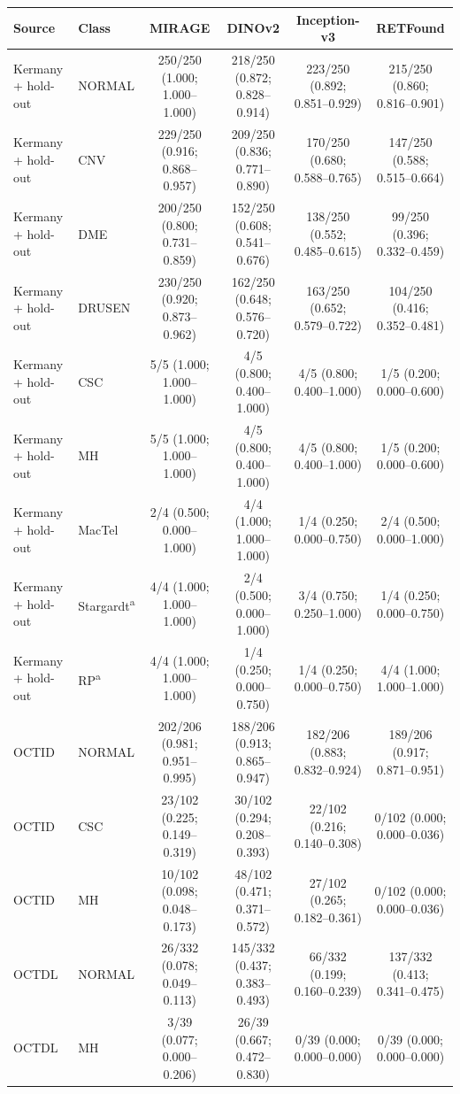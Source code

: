 \begin{tabular}{@{}llcccc@{}}
\toprule
Source & Class & MIRAGE & DINOv2 & Inception-v3 & RETFound \\
\midrule
Kermany + hold-out & NORMAL & 250/250 (1.000; 1.000--1.000) & 218/250 (0.872; 0.828--0.914) & 223/250 (0.892; 0.851--0.929) & 215/250 (0.860; 0.816--0.901) \\
Kermany + hold-out & CNV & 229/250 (0.916; 0.868--0.957) & 209/250 (0.836; 0.771--0.890) & 170/250 (0.680; 0.588--0.765) & 147/250 (0.588; 0.515--0.664) \\
Kermany + hold-out & DME & 200/250 (0.800; 0.731--0.859) & 152/250 (0.608; 0.541--0.676) & 138/250 (0.552; 0.485--0.615) & 99/250 (0.396; 0.332--0.459) \\
Kermany + hold-out & DRUSEN & 230/250 (0.920; 0.873--0.962) & 162/250 (0.648; 0.576--0.720) & 163/250 (0.652; 0.579--0.722) & 104/250 (0.416; 0.352--0.481) \\
Kermany + hold-out & CSC & 5/5 (1.000; 1.000--1.000) & 4/5 (0.800; 0.400--1.000) & 4/5 (0.800; 0.400--1.000) & 1/5 (0.200; 0.000--0.600) \\
Kermany + hold-out & MH & 5/5 (1.000; 1.000--1.000) & 4/5 (0.800; 0.400--1.000) & 4/5 (0.800; 0.400--1.000) & 1/5 (0.200; 0.000--0.600) \\
Kermany + hold-out & MacTel & 2/4 (0.500; 0.000--1.000) & 4/4 (1.000; 1.000--1.000) & 1/4 (0.250; 0.000--0.750) & 2/4 (0.500; 0.000--1.000) \\
Kermany + hold-out & Stargardt\textsuperscript{a} & 4/4 (1.000; 1.000--1.000) & 2/4 (0.500; 0.000--1.000) & 3/4 (0.750; 0.250--1.000) & 1/4 (0.250; 0.000--0.750) \\
Kermany + hold-out & RP\textsuperscript{a} & 4/4 (1.000; 1.000--1.000) & 1/4 (0.250; 0.000--0.750) & 1/4 (0.250; 0.000--0.750) & 4/4 (1.000; 1.000--1.000) \\
OCTID & NORMAL & 202/206 (0.981; 0.951--0.995) & 188/206 (0.913; 0.865--0.947) & 182/206 (0.883; 0.832--0.924) & 189/206 (0.917; 0.871--0.951) \\
OCTID & CSC & 23/102 (0.225; 0.149--0.319) & 30/102 (0.294; 0.208--0.393) & 22/102 (0.216; 0.140--0.308) & 0/102 (0.000; 0.000--0.036) \\
OCTID & MH & 10/102 (0.098; 0.048--0.173) & 48/102 (0.471; 0.371--0.572) & 27/102 (0.265; 0.182--0.361) & 0/102 (0.000; 0.000--0.036) \\
OCTDL & NORMAL & 26/332 (0.078; 0.049--0.113) & 145/332 (0.437; 0.383--0.493) & 66/332 (0.199; 0.160--0.239) & 137/332 (0.413; 0.341--0.475) \\
OCTDL & MH & 3/39 (0.077; 0.000--0.206) & 26/39 (0.667; 0.472--0.830) & 0/39 (0.000; 0.000--0.000) & 0/39 (0.000; 0.000--0.000) \\
\bottomrule
\end{tabular}
